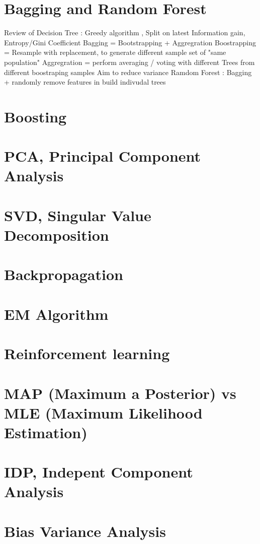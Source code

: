 \documentclass{article}
\begin{document}
\section{Bagging and Random Forest}
Review of Decision Tree : Greedy algorithm , Split on latest Information gain, Entropy/Gini Coefficient \newline
Bagging =  Bootstrapping + Aggregration \newline
Boostrapping = Resample with replacement, to generate different sample set of "same population"  \newline
Aggregration = perform averaging / voting with different Trees from different boostraping samples \newline
Aim to reduce variance \newline
Ramdom Forest : Bagging + randomly remove features in build indivudal trees \newline

\section{Boosting}
\section{PCA, Principal Component Analysis}
\section{SVD, Singular Value Decomposition}
\section{Backpropagation}
\section{EM Algorithm}
\section{Reinforcement learning}
\section{MAP (Maximum a Posterior) vs MLE (Maximum Likelihood Estimation)} 
\section{IDP, Indepent Component Analysis}
\section{Bias Variance Analysis} 
\end{document}

